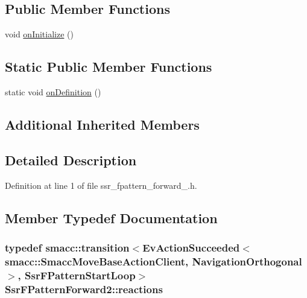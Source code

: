 \subsection*{Public Member Functions}
\begin{DoxyCompactItemize}
\item 
void \hyperlink{structSsrFPatternForward2_a81c19ada428b305cef1e21f39a090fa8}{on\+Initialize} ()
\end{DoxyCompactItemize}
\subsection*{Static Public Member Functions}
\begin{DoxyCompactItemize}
\item 
static void \hyperlink{structSsrFPatternForward2_a631add10c8ff5c96d45d54bdc5d918fc}{on\+Definition} ()
\end{DoxyCompactItemize}
\subsection*{Additional Inherited Members}


\subsection{Detailed Description}


Definition at line 1 of file ssr\+\_\+fpattern\+\_\+forward\+\_.\+h.



\subsection{Member Typedef Documentation}
\subsubsection[{\texorpdfstring{reactions}{reactions}}]{\setlength{\rightskip}{0pt plus 5cm}typedef {\bf smacc\+::transition}$<$Ev\+Action\+Succeeded$<${\bf smacc\+::\+Smacc\+Move\+Base\+Action\+Client}, {\bf Navigation\+Orthogonal}$>$, {\bf Ssr\+F\+Pattern\+Start\+Loop}$>$ {\bf Ssr\+F\+Pattern\+Forward2\+::reactions}}\hypertarget{structSsrFPatternForward2_ac0a963e017b7e9b15e6dd7c1b063d453}{}\label{structSsrFPatternForward2_ac0a963e017b7e9b15e6dd7c1b063d453}


